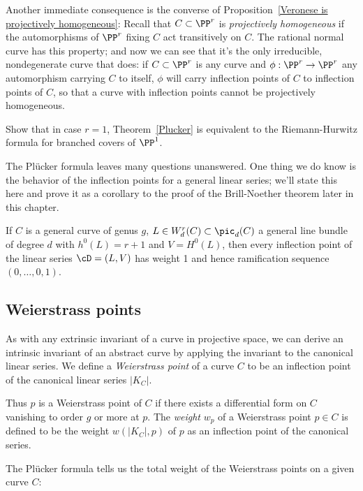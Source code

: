 Another immediate consequence is the converse of Proposition~\ref{Veronese is projectively homogeneous}: Recall that $C\subset \PP^r$ is \emph{projectively homogeneous} if the automorphisms of $\PP^r$ fixing
$C$ act transitively on $C$. The rational normal curve has this property; and now we can see that it's the only irreducible, nondegenerate curve that does: if $C \subset \PP^r$ is any curve and $\phi : \PP^r \to \PP^r$ any automorphism carrying $C$ to itself, $\phi$ will carry inflection points of $C$ to inflection points of $C$, so that a curve with inflection points cannot be projectively homogeneous.

\begin{exercise}
Show that in case $r=1$, Theorem~\ref{Plucker} is equivalent to the Riemann-Hurwitz formula for branched covers of $\PP^1$.
\end{exercise}

The Pl\"ucker formula leaves many questions unanswered. One thing we do know is the behavior of the inflection points for a general linear series; we'll state this here and prove it as a corollary to the proof of the Brill-Noether theorem later in this chapter.

\begin{theorem}\label{Brill Noether Plucker}
If $C$ is a general curve of genus $g$, $L \in W^r_d(C) \subset \pic_d(C)$ a general line bundle of degree $d$ with $h^0(L) = r+1$ and $V = H^0(L)$, then every inflection point of the linear series $\cD = (L, V)$ has weight 1 and hence ramification sequence $(0, \dots, 0, 1)$.
\end{theorem}

\subsection{Weierstrass points}

As with any extrinsic invariant of a curve in projective space, we can derive an intrinsic invariant of an abstract curve by applying the invariant to the canonical linear series. We define a \emph{Weierstrass point} of a curve $C$ to be an inflection point of the canonical linear series $|K_C|$. 

Thus $p$ is a Weierstrass point of $C$ if there exists a  differential form on $C$ vanishing to order $g$ or more at $p$. The \emph{weight} $w_p$ of a Weierstrass point $p \in C$  is defined to be the weight $w(|K_C|,p)$ of $p$ as an inflection point of the canonical series. 

The Pl\"ucker formula tells us  the total weight of the Weierstrass points on a given curve $C$:

